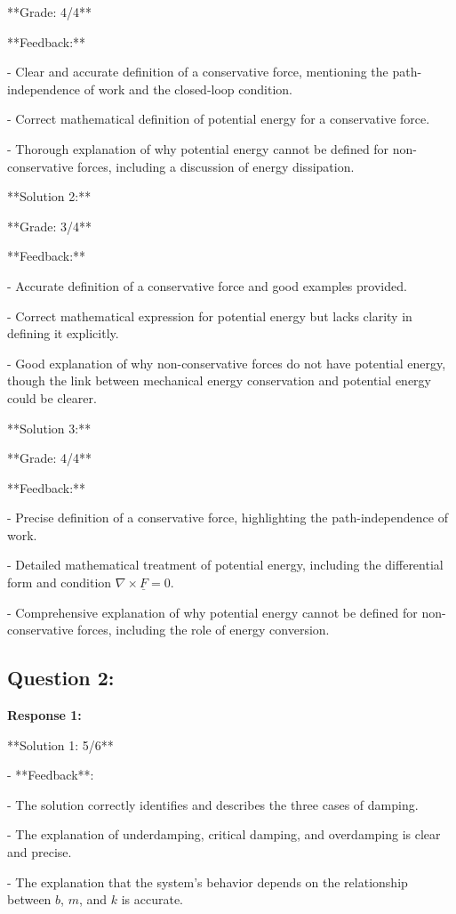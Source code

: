 \documentclass[a4paper,11pt]{article}
\begin{document}
**Grade: 4/4**

**Feedback:**

- Clear and accurate definition of a conservative force, mentioning the path-independence of work and the closed-loop condition.

- Correct mathematical definition of potential energy for a conservative force.

- Thorough explanation of why potential energy cannot be defined for non-conservative forces, including a discussion of energy dissipation.

**Solution 2:**

**Grade: 3/4**

**Feedback:**

- Accurate definition of a conservative force and good examples provided.

- Correct mathematical expression for potential energy but lacks clarity in defining it explicitly.

- Good explanation of why non-conservative forces do not have potential energy, though the link between mechanical energy conservation and potential energy could be clearer.

**Solution 3:**

**Grade: 4/4**

**Feedback:**

- Precise definition of a conservative force, highlighting the path-independence of work.

- Detailed mathematical treatment of potential energy, including the differential form and condition \(\nabla \times \underline{F} = 0\).

- Comprehensive explanation of why potential energy cannot be defined for non-conservative forces, including the role of energy conversion.

\subsection*{Question 2:}

\textbf{Response 1:}

**Solution 1: 5/6**

- **Feedback**:

  - The solution correctly identifies and describes the three cases of damping.
  
  - The explanation of underdamping, critical damping, and overdamping is clear and precise.
  
  - The explanation that the system's behavior depends on the relationship between \(b\), \(m\), and \(k\) is accurate.
  
\end{document}

